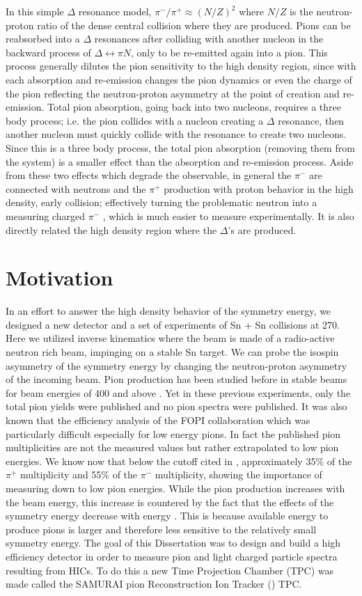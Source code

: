 In this simple $\Delta$ resonance model, $\pi^-/\pi^+ \approx (N/Z)^2$ where $N/Z$ is the neutron-proton ratio of the dense central collision where they are produced. Pions can be reabsorbed into a $\Delta$ resonances after colliding with another nucleon in the backward process of $\Delta \leftrightarrow \pi N$, only to be re-emitted again into a pion. This process generally dilutes the pion sensitivity to the high density region, since with each absorption and re-emission changes the pion dynamics or even the charge of the pion reflecting the neutron-proton asymmetry at the point of creation and re-emission. Total pion absorption, going back into two nucleons, requires a three body process; i.e. the pion collides with a nucleon creating a $\Delta$ resonance, then another nucleon must quickly collide with the resonance to create two nucleons. Since this is a three body process, the total pion absorption (removing them from the system) is a smaller effect than the absorption and re-emission process. Aside from these two effects which degrade the observable, in general the $\pi^-$ are connected with neutrons and the $\pi^+$ production with proton behavior in the high density, early collision; effectively turning the problematic neutron into a measuring charged $\pi^-$ , which is much easier to measure experimentally. It is also directly related the high density region where the $\Delta$'s are produced.  

\section{Motivation}
In an effort to answer the high density behavior of the symmetry energy, we designed a new detector and a set of experiments of Sn + Sn collisions at \SI{270}{\MeVA}. Here we utilized inverse kinematics where the beam is made of a radio-active neutron rich beam, impinging on a stable Sn target. We can probe the isospin asymmetry of the symmetry energy by changing the neutron-proton asymmetry of the incoming beam. Pion production has been studied before in stable beams for beam energies of \SI{400}{\MeVA} and above \cite{fopi}. Yet in these previous experiments, only the total pion yields were published and no pion spectra were published. It was also known that the efficiency analysis of the FOPI collaboration which was particularly difficult especially for low energy pions. In fact the published pion multiplicities are not the measured values but rather extrapolated to low pion energies. We know now that below the cutoff cited in \cite{fopi}, approximately 35\% of the $\pi^+$ multiplicity and 55\% of the $\pi^-$ multiplicity, showing the importance of measuring down to low pion energies. While the pion production increases with the beam energy, this increase is countered by the fact that the effects of the symmetry energy decrease with energy \cite{fopi}. This is because available energy to produce pions is larger and therefore less sensitive to the relatively small symmetry energy.  The goal of this Dissertation was to design and build a high efficiency detector in order to measure pion and light charged particle spectra resulting from HICs. To do this a new Time Projection Chamber (TPC) was made called the SAMURAI pion Reconstruction Ion Tracker (\spirit) TPC.

